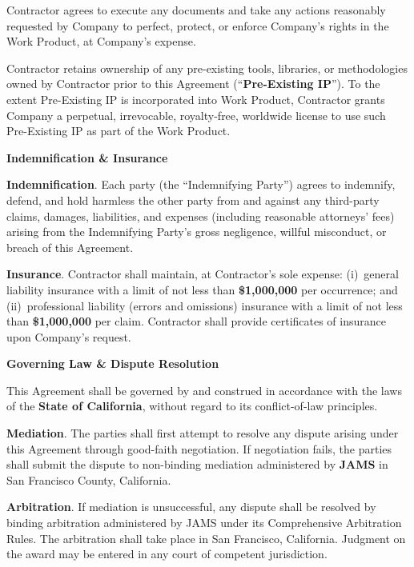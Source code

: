 \documentclass[10pt]{article}
\newcounter{artcnt}
\newcommand{\article}[1]{%
  \stepcounter{artcnt}%
  \vspace{11pt}%
  \noindent\makebox[22pt][l]{{\color{accent}\bfseries\Large\theartcnt.}}%
  {\color{accent}\bfseries\large#1}%
  \vspace{3pt}\par%
}
\newcommand{\cl}[1]{%
  \par\vspace{2pt}\noindent{\color{accent}\bfseries(#1)}\enspace%
}
\begin{document}
\cl{a} Contractor agrees to execute any documents and take any actions reasonably requested by Company to perfect, protect, or enforce Company's rights in the Work Product, at Company's expense.

\cl{b} Contractor retains ownership of any pre-existing tools, libraries, or methodologies owned by Contractor prior to this Agreement (``\textbf{Pre-Existing IP}''). To the extent Pre-Existing IP is incorporated into Work Product, Contractor grants Company a perpetual, irrevocable, royalty-free, worldwide license to use such Pre-Existing IP as part of the Work Product.

\article{Indemnification \& Insurance}

\cl{a} \textbf{Indemnification}. Each party (the ``Indemnifying Party'') agrees to indemnify, defend, and hold harmless the other party from and against any third-party claims, damages, liabilities, and expenses (including reasonable attorneys' fees) arising from the Indemnifying Party's gross negligence, willful misconduct, or breach of this Agreement.

\cl{b} \textbf{Insurance}. Contractor shall maintain, at Contractor's sole expense: (i)~general liability insurance with a limit of not less than \textbf{\$1,000,000} per occurrence; and (ii)~professional liability (errors and omissions) insurance with a limit of not less than \textbf{\$1,000,000} per claim. Contractor shall provide certificates of insurance upon Company's request.

\article{Governing Law \& Dispute Resolution}

This Agreement shall be governed by and construed in accordance with the laws of the \textbf{State of California}, without regard to its conflict-of-law principles.

\cl{a} \textbf{Mediation}. The parties shall first attempt to resolve any dispute arising under this Agreement through good-faith negotiation. If negotiation fails, the parties shall submit the dispute to non-binding mediation administered by \textbf{JAMS} in San Francisco County, California.

\cl{b} \textbf{Arbitration}. If mediation is unsuccessful, any dispute shall be resolved by binding arbitration administered by JAMS under its Comprehensive Arbitration Rules. The arbitration shall take place in San Francisco, California. Judgment on the award may be entered in any court of competent jurisdiction.
\end{document}
